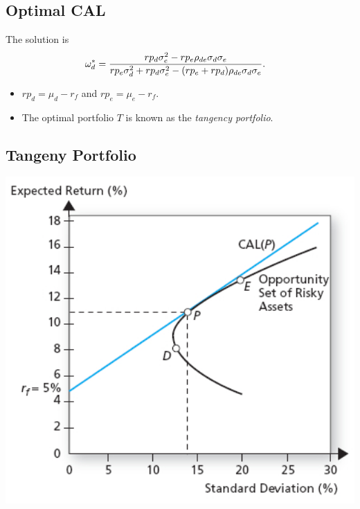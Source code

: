 \documentclass[letterpaper,10pt,english]{sphinxmanual}
\begin{document}
\subsection{Optimal CAL}
\label{portfolioOpt:id7}
The solution is
\begin{gather}
\begin{split}\omega_d^* & = \frac{rp_d \sigma^2_e - rp_e
\rho_{de} \sigma_d \sigma_e}{rp_e \sigma^2_d +
rp_d \sigma^2_e - (rp_e + rp_d) \rho_{de}
\sigma_d \sigma_e}.\end{split}\notag
\end{gather}\begin{itemize}
\item {} 
$rp_d = \mu_d - r_f$ and $rp_e = \mu_e - r_f$.

\end{itemize}
\begin{itemize}
\item {} 
The optimal portfolio $T$ is known as the \emph{tangency
portfolio}.

\end{itemize}


\subsection{Tangeny Portfolio}
\label{portfolioOpt:tangeny-portfolio}
\includegraphics[width=6in]{pg208_1.jpg}
\end{document}
